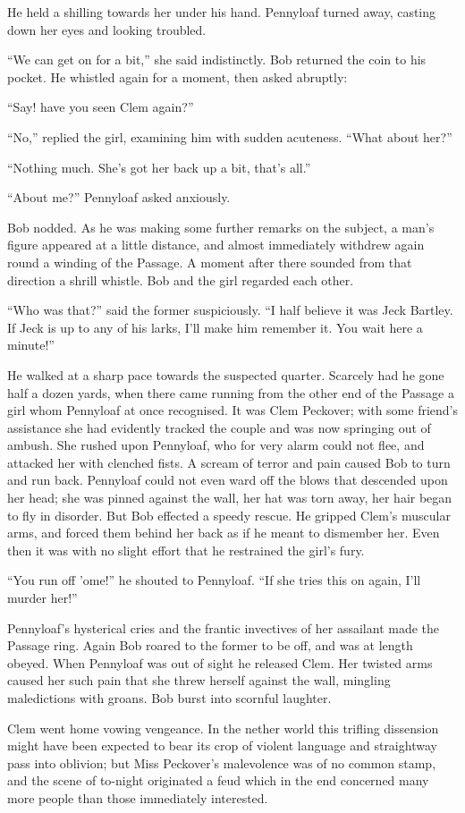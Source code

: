 He held a shilling towards her under his hand. Pennyloaf turned away,
casting down her eyes and looking troubled.

``We can get on for a bit,'' she said indistinctly. Bob returned the
coin to his pocket. He whistled again for a moment, then asked abruptly:

{\protect\hypertarget{187}{}{}}``Say! have you seen Clem again?''

``No,'' replied the girl, examining him with sudden acuteness. ``What
about her?''

``Nothing much. She's got her back up a bit, that's all.''

``About me?'' Pennyloaf asked anxiously.

Bob nodded. As he was making some further remarks on the subject, a
man's figure appeared at a little distance, and almost immediately
withdrew again round a winding of the Passage. A moment after there
sounded from that direction a shrill whistle. Bob and the girl regarded
each other.

``Who was that?'' said the former suspiciously. ``I half believe it was
Jeck Bartley. If Jeck is up to any of his larks, I'll make him remember
it. You wait here a minute!''

He walked at a sharp pace towards the suspected quarter. Scarcely had he
gone half a dozen yards, when there came running from the other end of
the Passage a girl whom Pennyloaf at once recognised. It was Clem
Peckover; with some friend's assistance she
{\protect\hypertarget{188}{}{}}had evidently tracked the couple and was
now springing out of ambush. She rushed upon Pennyloaf, who for very
alarm could not flee, and attacked her with clenched fists. A scream of
terror and pain caused Bob to turn and run back. Pennyloaf could not
even ward off the blows that descended upon her head; she was pinned
against the wall, her hat was torn away, her hair began to fly in
disorder. But Bob effected a speedy rescue. He gripped Clem's muscular
arms, and forced them behind her back as if he meant to dismember her.
Even then it was with no slight effort that he restrained the girl's
fury.

``You run off 'ome!'' he shouted to Pennyloaf. ``If she tries this on
again, I'll murder her!''

Pennyloaf's hysterical cries and the frantic invectives of her assailant
made the Passage ring. Again Bob roared to the former to be off, and was
at length obeyed. When Pennyloaf was out of sight he released Clem. Her
twisted arms caused her such pain that she threw herself against the
wall, mingling {\protect\hypertarget{189}{}{}}maledictions with groans.
Bob burst into scornful laughter.

Clem went home vowing vengeance. In the nether world this trifling
dissension might have been expected to bear its crop of violent language
and straightway pass into oblivion; but Miss Peckover's malevolence was
of no common stamp, and the scene of to-night originated a feud which in
the end concerned many more people than those immediately interested.
